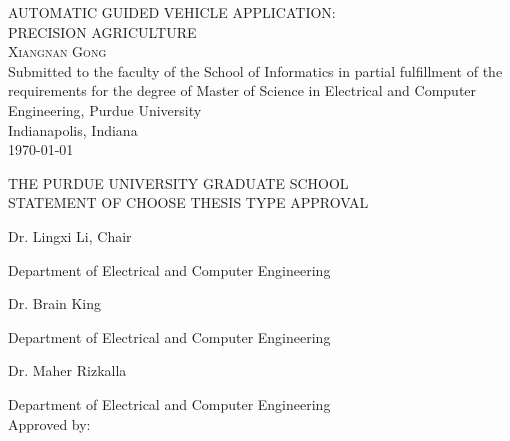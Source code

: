 \documentclass[letterpaper,12pt,oneside]{book}
\begin{document}
	
	\frontmatter
	\begin{titlepage}
		\begin{center}
		\textsc{\Large AUTOMATIC GUIDED VEHICLE APPLICATION:}\\[1cm]
		\textsc{\Large PRECISION AGRICULTURE}\\[5cm] 
		\textsc{\Large Xiangnan Gong}\\[5cm] 
		{\large Submitted to the faculty of the School of Informatics in partial fulfillment of the requirements for the degree of Master of Science in Electrical and Computer Engineering, Purdue University \\[0.5cm]Indianapolis, Indiana}\\[0.5cm] 
		{\large \today}
		\end{center}
		\newpage
		\begin{center}
			THE PURDUE UNIVERSITY GRADUATE SCHOOL \\
			STATEMENT OF CHOOSE THESIS TYPE APPROVAL
			\\[2cm]
		\end{center}
		
		
		Dr. Lingxi Li, Chair
		
		\hspace{1cm} Department of Electrical and Computer Engineering
		
		Dr. Brain King 
		
		\hspace{1cm} Department of Electrical and Computer Engineering		
		
		Dr. Maher Rizkalla 
		
		\hspace{1cm} Department of Electrical and Computer Engineering	\\[2cm]
		
		
		Approved by:
		
			
		
	\end{titlepage}
	
	\begin{spacing}{1.5}
		\setcounter{tocdepth}{3}
		\renewcommand\contentsname{TABLE OF CONTENTS}
		\tableofcontents
		
		\renewcommand\listfigurename{LIST OF FIGURES}
		\listoffigures
		
		
		\renewcommand\listtablename{LIST OF TABLES}
		\listoftables
	\end{spacing}
		
\end{document}
